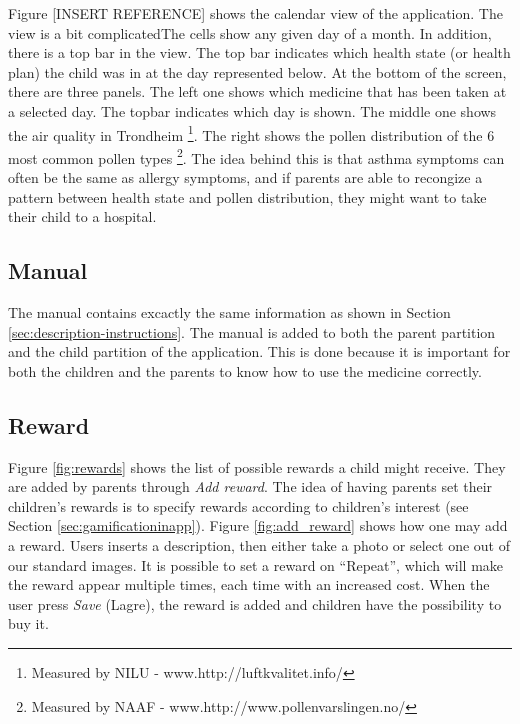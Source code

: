 Figure [INSERT REFERENCE] shows the calendar view of the application. The view is a bit complicatedThe cells show any given day of a month. In addition, there is a top bar in the view. The top bar indicates which health state (or health plan) the child was in at the day represented below. At the bottom of the screen, there are three panels. The left one shows which medicine that has been taken at a selected day. The topbar indicates which day is shown. The middle one shows the air quality in Trondheim \footnote{Measured by NILU - www.http://luftkvalitet.info/}. The right shows the pollen distribution of the 6 most common pollen types \footnote{Measured by NAAF - www.http://www.pollenvarslingen.no/}. The idea behind this is that asthma symptoms can often be the same as allergy symptoms, and if parents are able to recongize a pattern between health state and pollen distribution, they might want to take their child to a hospital.    


\subsection{Manual}
\label{sec:description-manual}
The manual contains excactly the same information as shown in Section \ref{sec:description-instructions}. The manual is added to both the parent partition and the child partition of the application. This is done because it is important for both the children and the parents to know how to use the medicine correctly. 


\subsection{Reward}
\label{sec:description-manage-rewards}
Figure \ref{fig:rewards} shows the list of possible rewards a child might receive. They are added by parents through \emph{Add reward}. The idea of having parents set their children's rewards is to specify rewards according to children's interest (see Section \ref{sec:gamificationinapp}). Figure \ref{fig:add_reward} shows how one may add a reward. Users inserts a description, then either take a photo or select one out of our standard images. It is possible to set a reward on ``Repeat'', which will make the reward appear multiple times, each time with an increased cost.        
When the user press \emph{Save} (Lagre), the reward is added and children have the possibility to buy it. 
 